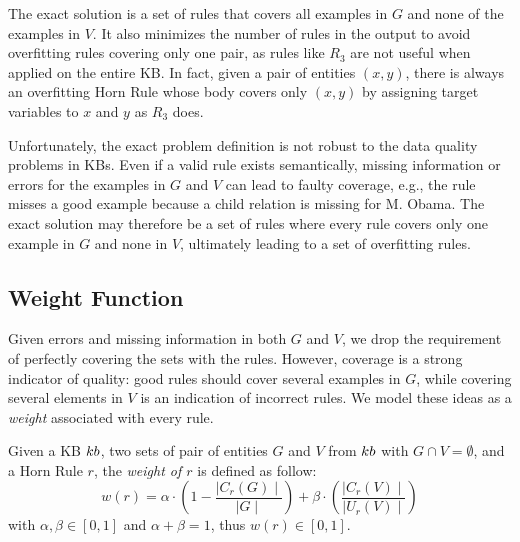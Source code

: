 The exact solution is a set of rules that covers all examples in $G$ and none of the examples in $V$. It also minimizes the number of rules in the output to avoid overfitting rules covering only one pair, as rules like $R_{3}$ are not useful when applied on the entire KB. In fact, given a pair of entities $(x,y)$, there is always an overfitting Horn Rule whose body covers only $(x,y)$ by assigning target variables to $x$ and $y$ as $R_{3}$ does.

Unfortunately, the exact problem definition is not robust to the %
data quality problems in KBs. Even if a valid rule exists semantically, missing information or errors for the examples in $G$ and $V$ can lead to faulty coverage, e.g., the rule misses a good example because a child relation is missing for M. Obama. %
The exact solution may therefore be a set of rules where every rule covers only one example in $G$ and none in $V$, ultimately leading to a set of overfitting rules.

\vspace{-1ex}	
\subsection{Weight Function} \label{sec:krd_weight_fun}
\vspace{-1ex}	
Given errors and missing information in both $G$ and $V$, we drop the requirement of perfectly covering the sets with the rules. However, coverage is a strong indicator of quality: good rules should cover several examples in $G$, while covering several elements in $V$ is an indication of incorrect rules.
We model these ideas as a \emph{weight} associated with every rule. %


\begin{definition}
	Given a KB ${\sc kb}$, two sets of pair of entities $G$ and $V$ from ${\sc kb}$ with $G \cap V = \emptyset$, and a Horn Rule $r$, the {\em weight of $r$} is defined as follow:
	\begin{equation} \label{eq:weight_fun}
		w(r) = \alpha \cdot (1-\frac{\mid C_{r}(G)\mid}{\mid G \mid}) +\beta \cdot (\frac{\mid C_{r}(V) \mid}{\mid U_{r}(V)\mid})
	\end{equation}
	with $\alpha,\beta \in [0,1]$ and $\alpha + \beta = 1$, thus $w(r) \in [0,1]$. 
\end{definition}

